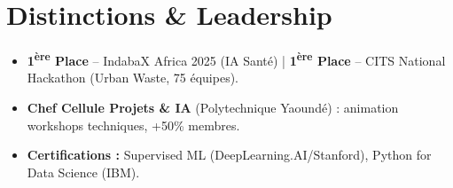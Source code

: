 \documentclass[a4paper,11pt]{article}
\begin{document}
\section{Distinctions \& Leadership}
\begin{itemize}[leftmargin=*, nosep]
    \item \small{\textbf{1\textsuperscript{ère} Place} -- IndabaX Africa 2025 (IA Santé) | \textbf{1\textsuperscript{ère} Place} -- CITS National Hackathon (Urban Waste, 75 équipes).}
    \item \small{\textbf{Chef Cellule Projets \& IA} (Polytechnique Yaoundé) : animation workshops techniques, +50\% membres.}
    \item \small{\textbf{Certifications :} Supervised ML (DeepLearning.AI/Stanford), Python for Data Science (IBM).}
\end{itemize}
\end{document}
